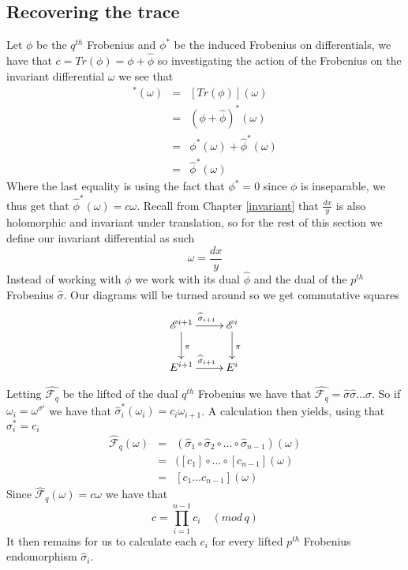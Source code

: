 \subsection{Recovering the trace}
Let $\phi$ be the $q^{th}$ Frobenius and $\phi^*$ be the induced Frobenius on differentials, 
we have that $c = Tr(\phi) = \phi + \widehat{\phi}$ so investigating the
action of the Frobenius on the invariant differential $\omega$ we see that
\begin{eqnarray}
 [Tr(\phi)]^*(\omega)&=& [Tr(\phi)](\omega) \nonumber \\
		     &=& (\phi + \widehat{\phi})^*(\omega) \nonumber \\
		     &=& \phi^*(\omega) + \widehat{\phi}^*(\omega) \nonumber \\
		     &=& \widehat{\phi}^*(\omega) \nonumber
\end{eqnarray}
Where the last equality is using the fact that $\phi^* = 0$ since $\phi$ is inseparable, we thus
get that $\widehat{\phi}^*(\omega) = c\omega$.
Recall from Chapter \ref{invariant} that $\frac{dx}{y}$ is also holomorphic and invariant under translation,
so for the rest of this section we define our invariant differential as such
$$ \omega = \frac{dx}{y} $$
Instead of working with $\phi$ we work with its dual $\widehat{\phi}$ and the dual
of the $p^{th}$ Frobenius $\widehat{\sigma}$. Our diagrams will be turned around so we get commutative
squares
$$
\xymatrix {
  \mathscr{E}^{i+1} \ar[r]^{\widehat{\sigma}_{i+1}} \ar[d]^\pi & \mathscr{E}^i \ar[d]^\pi \\
  E^{i+1} \ar[r]^{\widehat{\sigma}_{i+1}} & E^i 
}
$$

Letting $\widehat{\mathscr{F}_q}$ be the lifted of the dual $q^{th}$ Frobenius we have that
$\widehat{\mathscr{F}_q} = \widehat{\sigma} \widehat{\sigma} \ldots \widehat{\sigma}$.
So if $\omega_i = \omega^{\sigma^i}$ we have that $\widehat{\sigma}_i^*(\omega_i) = c_i \omega_{i+1}$.
A calculation then yields, using that $\sigma_i^* = c_i$
\begin{eqnarray}
  \widehat{\mathscr{F}}_q(\omega) &=& (\widehat{\sigma}_1 \circ \widehat{\sigma}_2 \circ \ldots \circ \widehat{\sigma}_{n-1})(\omega) \nonumber \\
			      &=& ([c_1] \circ \ldots \circ [c_{n-1}](\omega) \nonumber \\
			      &=& [c_1\ldots c_{n-1}](\omega) \nonumber
\end{eqnarray}
Since $\widehat{\mathscr{F}}_q(\omega) = c \omega$ we have that
$$ c = \prod_{i=1}^{n-1} c_i \quad (mod\, q) $$
It then remains for us to calculate each $c_i$ for every lifted $p^{th}$ Frobenius
endomorphism $\widehat{\sigma}_i$.

